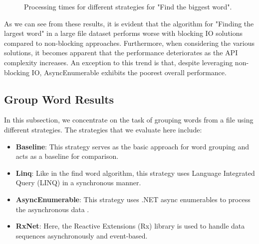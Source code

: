 \begin{figure}[H]
    \raggedright
    \caption{Processing times for different strategies for "Find the biggest word".}
    \label{fig:biggest_word_results_cs_2}
\end{figure}

As we can see from these results, it is evident that the algorithm for "Finding the largest word" in a large file dataset performs worse with blocking IO solutions compared to non-blocking approaches. Furthermore, when considering the various solutions, it becomes apparent that the performance deteriorates as the API complexity increases. An exception to this trend is that, despite leveraging non-blocking IO, AsyncEnumerable exhibits the poorest overall performance.

\clearpage


\subsection{Group Word Results}
\label{subsubsec:group_word_processing_times_cs}

In this subsection, we concentrate on the task of grouping words from a file using different strategies. The strategies that we evaluate here include:

\begin{itemize}
    \item \textbf{Baseline}: This strategy serves as the basic approach for word grouping and acts as a baseline for comparison.
    \item \textbf{Linq}: Like in the find word algorithm, this strategy uses Language Integrated Query (LINQ) in a synchronous manner.
    \item \textbf{AsyncEnumerable}: This strategy uses .NET async enumerables to process the asynchronous data .
    \item \textbf{RxNet}: Here, the Reactive Extensions (Rx) library is used to handle data sequences asynchronously and event-based.
\end{itemize}


